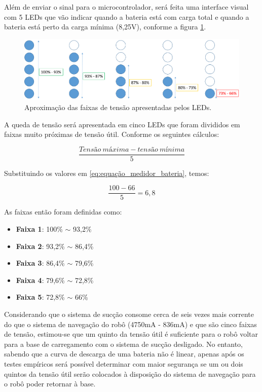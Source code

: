 		Além de enviar o sinal para o microcontrolador, será feita uma interface visual com 5 LEDs que vão indicar quando a bateria está com carga total e quando a bateria está perto da carga mínima (8,25V), conforme a figura \ref{img:faixa_de_tensão}.

		\begin{figure}[H]
			\centering
			\includegraphics[scale=0.3]{figuras/LEDs.png}
			\caption{Aproximação das faixas de tensão apresentadas pelos LEDs.}
			\label{img:faixa_de_tensão}
		\end{figure}

		A queda de tensão será apresentada em cinco LEDs que foram divididos em faixas muito próximas de tensão útil. Conforme os seguintes cálculos:

		\begin{equation}
		\label{eq:equação_medidor_bateria}
			\frac{Tensão\ máxima - tensão\ mínima}{5}  
		\end{equation}

		Substituindo os valores em \ref{eq:equação_medidor_bateria}, temos:

		\begin{equation}
		\label{eq:equação_medidor_bateria_2}
			\frac{100-66}{5} = 6,8  
		\end{equation}

		As faixas então foram definidas como:

		\begin{itemize}
			\item \textbf{Faixa 1}: 100\% $\sim$ 93,2\%
			\item \textbf{Faixa 2}: 93,2\% $\sim$ 86,4\%
			\item \textbf{Faixa 3}: 86,4\% $\sim$ 79,6\%
			\item \textbf{Faixa 4}: 79,6\% $\sim$ 72,8\%
			\item \textbf{Faixa 5}: 72,8\% $\sim$ 66\%
		\end{itemize}
		
		Considerando que o sistema de sucção consome cerca de seis vezes mais corrente do que o sistema de navegação do robô (4750mA - 836mA) e que são cinco faixas de tensão, estimou-se que um quinto da tensão útil é suficiente para o robô voltar para a base de carregamento com o sistema de sucção desligado. No entanto, sabendo que a curva de descarga de uma bateria não é linear, apenas após os testes empíricos será possível determinar com maior segurança se um ou dois quintos da tensão útil serão colocados à disposição do sistema de navegação para o robô poder retornar à base. 

